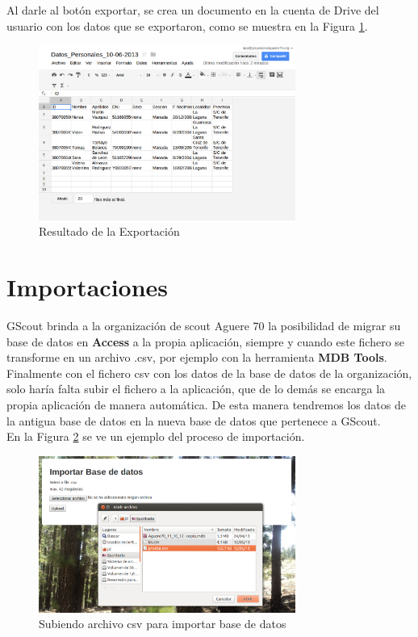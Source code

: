 Al darle al botón exportar, se crea un documento en la cuenta de Drive del usuario con los datos que se exportaron, como se muestra en la Figura \ref{fig:export_drive}.\\

\begin{figure}[H]
\begin{center}
\includegraphics[width=0.75\textwidth]{images/result_export.jpg}
\caption{Resultado de la Exportación}
\label{fig:export_drive}
\end{center}
\end{figure}

\section{Importaciones}
\label{3:sec7}

GScout brinda a la organización de scout Aguere 70 la posibilidad de migrar su base de datos en \textbf{Access} a la propia aplicación, siempre y cuando este fichero se transforme en un archivo .csv, por ejemplo con la herramienta \textbf{MDB Tools}.
Finalmente con el fichero csv con los datos de la base de datos de la organización, solo haría falta subir el fichero a la aplicación, que de lo demás se encarga la propia aplicación de manera automática. De esta manera tendremos los datos de la antigua base de datos en la nueva base de datos que pertenece a GScout.\\

En la Figura \ref{fig:import} se ve un ejemplo del proceso de importación.\\ 
\begin{figure}[H]
\begin{center}
\includegraphics[width=0.75\textwidth]{images/import_db.jpg}
\caption{Subiendo archivo csv para importar base de datos}
\label{fig:import}
\end{center}
\end{figure}

